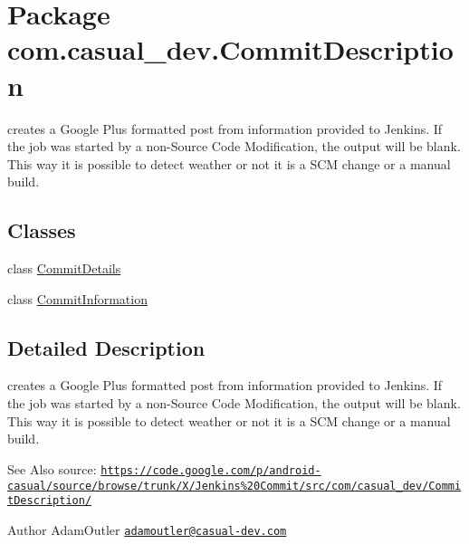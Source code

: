 \hypertarget{namespacecom_1_1casual__dev_1_1CommitDescription}{\section{Package com.\-casual\-\_\-dev.\-Commit\-Description}
\label{namespacecom_1_1casual__dev_1_1CommitDescription}
}


creates a Google Plus formatted post from information provided to Jenkins. If the job was started by a non-\/\-Source Code Modification, the output will be blank. This way it is possible to detect weather or not it is a S\-C\-M change or a manual build.  


\subsection*{Classes}
\begin{DoxyCompactItemize}
\item 
class \hyperlink{classcom_1_1casual__dev_1_1CommitDescription_1_1CommitDetails}{Commit\-Details}
\item 
class \hyperlink{classcom_1_1casual__dev_1_1CommitDescription_1_1CommitInformation}{Commit\-Information}
\end{DoxyCompactItemize}


\subsection{Detailed Description}
creates a Google Plus formatted post from information provided to Jenkins. If the job was started by a non-\/\-Source Code Modification, the output will be blank. This way it is possible to detect weather or not it is a S\-C\-M change or a manual build. \begin{DoxySeeAlso}{See Also}
source\-: \href{https://code.google.com/p/android-casual/source/browse/trunk/X/Jenkins%20Commit/src/com/casual_dev/CommitDescription/}{\tt https\-://code.\-google.\-com/p/android-\/casual/source/browse/trunk/\-X/\-Jenkins\%20\-Commit/src/com/casual\-\_\-dev/\-Commit\-Description/} 
\end{DoxySeeAlso}
\begin{DoxyAuthor}{Author}
Adam\-Outler \href{mailto:adamoutler@casual-dev.com}{\tt adamoutler@casual-\/dev.\-com} 
\end{DoxyAuthor}
